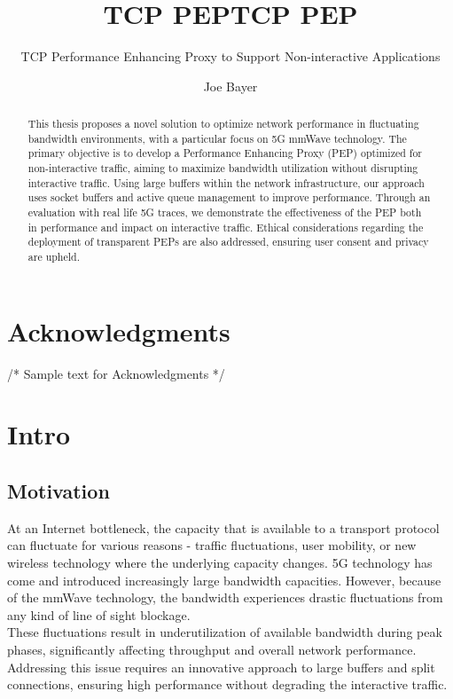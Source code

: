 \documentclass[a4paper,english, 11pt]{report}
\author{Joe Bayer}
\title{TCP PEP}
\subtitle{TCP Performance Enhancing Proxy to Support Non-interactive Applications}
\title{TCP PEP}
\begin{document}
\uiomasterfp[program={Informatics: Programming and System Architecture}, supervisors={Michael Welzl\and Kristjon Ciko}]
\tableofcontents


\listoffigures
{}

\begin{abstract}
This thesis proposes a novel solution to optimize network performance in fluctuating bandwidth environments, with a particular focus on 5G mmWave technology. The primary objective is to develop a Performance Enhancing Proxy (PEP) optimized for non-interactive traffic, aiming to maximize bandwidth utilization without disrupting interactive traffic. Using large buffers within the network infrastructure, our approach uses socket buffers and active queue management to improve performance. Through an evaluation with real life 5G traces, we demonstrate the effectiveness of the PEP both in performance and impact on interactive traffic. Ethical considerations regarding the deployment of transparent PEPs are also addressed, ensuring user consent and privacy are upheld.
\end{abstract}

\chapter*{Acknowledgments}
\lipsum[1-2]  /* Sample text for Acknowledgments */

\chapter{Intro}

\section{Motivation}
At an Internet bottleneck, the capacity that is available to a transport protocol can fluctuate for various reasons - traffic fluctuations, user mobility, or new wireless technology where the underlying capacity changes. 5G technology has come and introduced increasingly large bandwidth capacities\cite{Agrawal_Sharma_2016}. However, because of the mmWave technology, the bandwidth experiences drastic fluctuations from any kind of line of sight blockage\cite{mmwave_blocking}.\\ These fluctuations result in underutilization of available bandwidth during peak phases, significantly affecting throughput and overall network performance. Addressing this issue requires an innovative approach to large buffers and split connections, ensuring high performance without degrading the interactive traffic.\\
\end{document}
